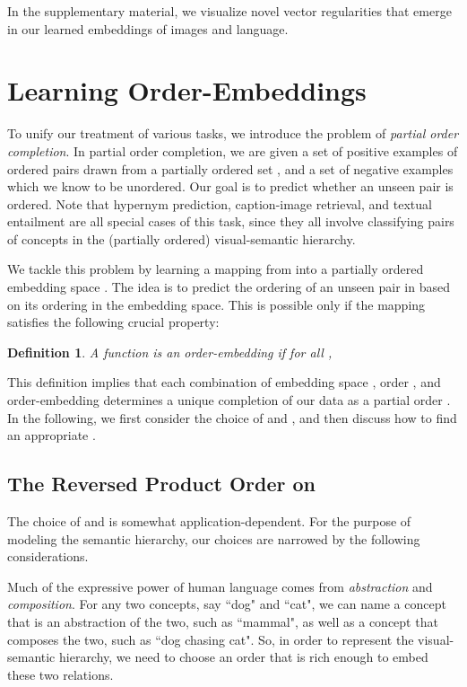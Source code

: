 \documentclass{article} \usepackage{iclr2016_conference,times}
\newtheorem{definition}{Definition}
\begin{document}
In the supplementary material, we visualize novel vector regularities that emerge in our learned embeddings of images and language.
 
\section{Learning Order-Embeddings}
\label{method}
To unify our treatment of various tasks, we introduce the problem of \emph{partial order completion}.
In partial order completion, we are given a set of positive examples  of ordered pairs drawn from a partially ordered set  , and a set of negative examples  which we know to be unordered. Our goal is to predict whether an unseen pair  is ordered. Note that  hypernym prediction, caption-image retrieval, and textual entailment are all special cases of this task, since they all involve classifying pairs of concepts in the (partially ordered) visual-semantic hierarchy.





We tackle this problem by  learning a mapping from  into a partially ordered embedding space . The idea is to predict the ordering of an unseen pair in  based on its ordering in the embedding space.  This is possible only if the mapping satisfies the following crucial property:
\begin{definition}
\label{eq:order}
A function  is an order-embedding if for all ,

\end{definition}

This definition implies that each combination of embedding space , order , and order-embedding  determines a unique completion of our data as a partial order . In the following, we first consider the choice of  and , and then discuss how to find an appropriate .

\subsection{The Reversed Product Order on }
The choice of  and  is somewhat application-dependent. For the purpose of modeling the semantic hierarchy, our choices are narrowed by the following considerations.

Much of the expressive power of human language comes from \emph{abstraction} and \emph{composition}. 
For any two concepts, say ``dog" and ``cat", we can name a concept that is an abstraction of the two, such as ``mammal", as well as a concept that composes the two, such as ``dog chasing cat". 
So, in order to represent the visual-semantic hierarchy, we need to choose an order  that is rich enough to embed these two relations.
\end{document}
